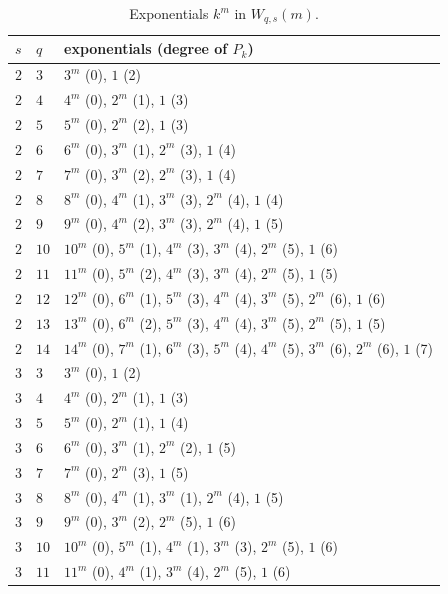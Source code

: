 \documentclass[12pt,reqno]{article}
\begin{document}
\begin{table}[ht]
\begin{center}
\begin{tabular}{lll}
\hline
$s$ & $q$ & exponentials (degree of $P_k$) \\
\hline
$2$ & $3$ & $3^m$ (0), $1$ (2) \\
$2$ & $4$ & $4^m$ (0), $2^m$ (1), $1$ (3) \\
$2$ & $5$ & $5^m$ (0), $2^m$ (2), $1$ (3) \\
$2$ & $6$ & $6^m$ (0), $3^m$ (1), $2^m$ (3), $1$ (4) \\
$2$ & $7$ & $7^m$ (0), $3^m$ (2), $2^m$ (3), $1$ (4) \\
$2$ & $8$ & $8^m$ (0), $4^m$ (1), $3^m$ (3), $2^m$ (4), $1$ (4) \\
$2$ & $9$ & $9^m$ (0), $4^m$ (2), $3^m$ (3), $2^m$ (4), $1$ (5) \\
$2$ & $10$ & $10^m$ (0), $5^m$ (1), $4^m$ (3), $3^m$ (4), $2^m$ (5), $1$ (6) \\
$2$ & $11$ & $11^m$ (0), $5^m$ (2), $4^m$ (3), $3^m$ (4), $2^m$ (5), $1$ (5) \\
$2$ & $12$ & $12^m$ (0), $6^m$ (1), $5^m$ (3), $4^m$ (4), $3^m$ (5), $2^m$ (6), $1$ (6) \\
$2$ & $13$ & $13^m$ (0), $6^m$ (2), $5^m$ (3), $4^m$ (4), $3^m$ (5), $2^m$ (5), $1$ (5) \\
$2$ & $14$ & $14^m$ (0), $7^m$ (1), $6^m$ (3), $5^m$ (4), $4^m$ (5), $3^m$ (6), $2^m$ (6), $1$ (7) \\
$3$ & $3$ & $3^m$ (0), $1$ (2) \\
$3$ & $4$ & $4^m$ (0), $2^m$ (1), $1$ (3) \\
$3$ & $5$ & $5^m$ (0), $2^m$ (1), $1$ (4) \\
$3$ & $6$ & $6^m$ (0), $3^m$ (1), $2^m$ (2), $1$ (5) \\
$3$ & $7$ & $7^m$ (0), $2^m$ (3), $1$ (5) \\
$3$ & $8$ & $8^m$ (0), $4^m$ (1), $3^m$ (1), $2^m$ (4), $1$ (5) \\
$3$ & $9$ & $9^m$ (0), $3^m$ (2), $2^m$ (5), $1$ (6) \\
$3$ & $10$ & $10^m$ (0), $5^m$ (1), $4^m$ (1), $3^m$ (3), $2^m$ (5), $1$ (6) \\
$3$ & $11$ & $11^m$ (0), $4^m$ (1), $3^m$ (4), $2^m$ (5), $1$ (6) \\
\hline
\end{tabular}
\end{center}
\caption{Exponentials $k^m$ in $W_{q,s}(m)$.}\label{tab:bases}
\end{table}
\end{document}
